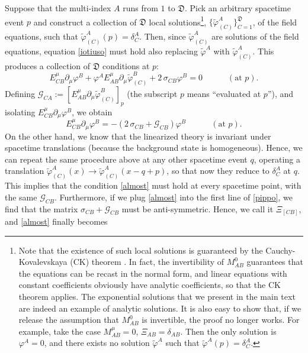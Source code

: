 \documentclass[aps,prl,singlecolumn,nofootinbib]{revtex4-2}
\newcommand{\spc}{\quad \quad \quad}
\theoremstyle{definition}
\theoremstyle{theorem}
\begin{document}
Suppose that the multi-index $A$ runs from $1$ to $\mathfrak{D}$. Pick an arbitrary spacetime event $p$ and construct a collection of $\mathfrak{D}$ local solutions\footnote{Note that the existence of such local solutions is guaranteed by the Cauchy-Kovalevskaya (CK) theorem \cite{Rauch_book,CourantHilbert2_book}. In fact, the invertibility of $M^0_{AB}$ guarantees that the equations can be recast in the normal form, and linear equations with constant coefficients obviously have analytic coefficients, so that the CK theorem applies. The exponential solutions that we present in the main text are indeed an example of analytic solutions. It is also easy to show that, if we release the assumption that $M^0_{AB}$ is invertible, the proof no longer works. For example, take the case $M^\mu_{AB}=0$, $\Xi_{AB}=\delta_{AB}$. Then the only solution is $\varphi^A=0$, and there exists no solution $\tilde{\varphi}^A$ such that $\tilde{\varphi}^A(p)=\delta^A_C$.}, $\{\tilde{\varphi}^A_{(C)} \}_{C=1}^\mathfrak{D}$, of the field equations, such that $\tilde{\varphi}^A_{(C)}(p)=\delta^A_C$. Then, since $\tilde{\varphi}^A_{(C)}$ are solutions of the field equations, equation \eqref{iotiuso} must hold also replacing $\tilde{\varphi}^A$ with $\tilde{\varphi}^A_{(C)}$. This produces a collection of $\mathfrak{D}$ conditions at $p$:
\begin{equation}
E^\mu_{CB}\partial_\mu \varphi^B +\varphi^A E^\mu_{AB}\partial_\mu \tilde{\varphi}^B_{(C)} +2 \, \sigma_{CB}\varphi^B  =0 \spc (\text{at }p).
\end{equation}
Defining $\mathcal{G}_{CA}:= [E^\mu_{AB}\partial_\mu \tilde{\varphi}^B_{(C)}]_p$ (the subscript $p$ means ``evaluated at $p$''), and isolating $E^\mu_{CB}\partial_\mu \varphi^B$, we obtain
\begin{equation}\label{almost}
E^\mu_{CB}\partial_\mu \varphi^B =-(2 \, \sigma_{CB}+\mathcal{G}_{CB})\varphi^B   \spc (\text{at }p).
\end{equation}
On the other hand, we know that the linearized theory is invariant under spacetime translations (because the background state is homogeneous). Hence, we can repeat the same procedure above at any other spacetime event $q$, operating a translation $\tilde{\varphi}^A_{(C)}(x)\rightarrow \tilde{\varphi}^A_{(C)}(x-q+p)$, so that now they reduce to $\delta^A_C$ at $q$. This implies that the condition \eqref{almost} must hold at every spacetime point, with the same $\mathcal{G}_{CB}$. Furthermore, if we plug \eqref{almost} into the first line of \eqref{pippo}, we find that the matrix $\sigma_{CB}+\mathcal{G}_{CB}$ must be anti-symmetric. Hence, we call it $\Xi_{[CB]}$, and \eqref{almost} finally becomes
\end{document}
